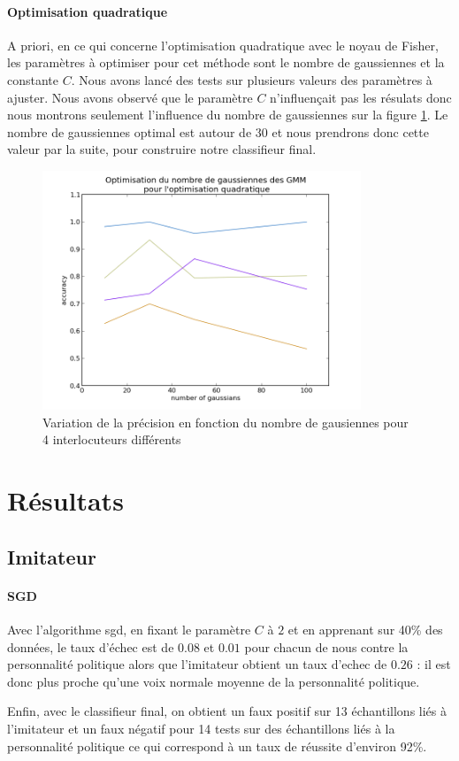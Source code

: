 \documentclass{article}
\begin{document}
\paragraph{Optimisation quadratique}
A priori, en ce qui concerne l'optimisation quadratique avec le noyau de Fisher, les paramètres à optimiser pour cet méthode sont le nombre de gaussiennes et la constante $C$.
Nous avons lancé des tests sur plusieurs valeurs des paramètres à ajuster. Nous avons observé que le paramètre $C$ n'influençait pas les résulats donc nous montrons seulement l'influence du nombre de gaussiennes sur la figure \ref{opt_qp}. Le nombre de gaussiennes optimal est autour de 30 et nous prendrons donc cette valeur par la suite, pour construire notre classifieur final.

\begin{figure}[!h]
\includegraphics[width=0.85\textwidth]{img/opt_qp_pdf}
\caption{Variation de la précision en fonction du nombre de gausiennes pour 4 interlocuteurs différents}\label{opt_qp}
\end{figure}

\section{Résultats}
\label{imitateur}
\subsection{Imitateur}
\paragraph{SGD}
Avec l'algorithme sgd, en fixant le paramètre $C$ à $2$ et en apprenant sur 40\% des données, le taux d'échec est de $0.08$ et $0.01$ pour chacun de nous contre la personnalité politique alors que l'imitateur obtient un taux d'echec de $0.26$ : il est donc plus proche qu'une voix normale moyenne de la personnalité politique. 

Enfin, avec le classifieur final, on obtient un faux positif sur 13 échantillons liés à l'imitateur et un faux négatif pour 14 tests sur des échantillons liés à la personnalité politique ce qui correspond à un taux de réussite d'environ 92\%.



\end{document}
